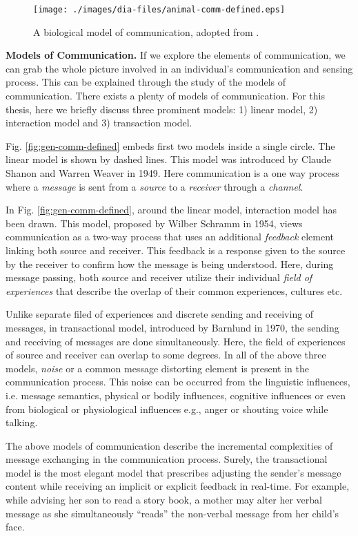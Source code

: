 \begin{figure}
\centering
\texttt{[image: ./images/dia-files/animal-comm-defined.eps]}
\caption{ A biological model of communication, adopted from \protect{}.}
\label{fig:bio-comm-defined} 
\end{figure}
\textbf{Models of Communication.} If we explore the elements of communication, we can grab the whole picture involved in an individual's communication and sensing process. This can be explained through the study of the models  of communication. There exists a plenty of models of communication. For this thesis, here we briefly discuss three prominent models: 1) linear model, 2) interaction model and 3) transaction model.

Fig. \ref{fig:gen-comm-defined} embeds first two models inside a single circle. The linear model is shown by dashed lines. This model was introduced by Claude Shanon and Warren Weaver in 1949. Here communication is a one way process where a {\em message} is sent from a {\em source} to a {\em receiver} through a {\em channel}.

In Fig. \ref{fig:gen-comm-defined}, around the linear model, interaction model has been drawn. This model, proposed by Wilber Schramm in 1954, views communication as a two-way process that uses an additional {\em feedback} element  linking both source and receiver. This feedback is a response given to the source by the receiver to confirm how the message is being understood. Here, during message passing, both source and receiver utilize their individual {\em field of experiences} that describe the overlap of their common experiences, cultures etc. 

Unlike separate filed of experiences and discrete sending and receiving of messages, in transactional model, introduced by Barnlund in 1970, the sending and receiving of messages are done simultaneously. Here, the  field of experiences of source and receiver can overlap to some degrees. In all of the above three models, {\em noise} or a common message distorting element is present in the communication process. This noise can be occurred from the linguistic influences, i.e. message semantics,  physical or bodily influences, cognitive influences or even from biological
or physiological influences e.g., anger or shouting voice while talking.

The above models of communication describe the incremental complexities of message exchanging in the communication process. Surely, the transactional model is the most elegant model that prescribes adjusting the sender's message content while receiving an implicit or explicit feedback in real-time. For example, while advising her son to read a story book, a mother may alter her verbal message as she simultaneously ``reads'' the non-verbal message from her child's face. 

